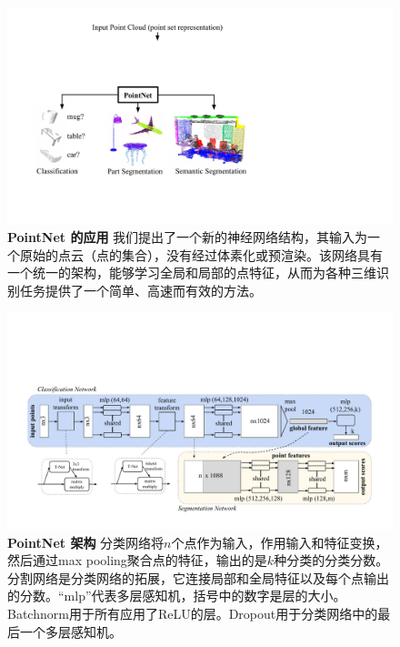 \begin{figure}
    \centering
    \includegraphics[width=\linewidth]{fig/teaser.pdf}
    \caption{\textbf{PointNet 的应用} 
    我们提出了一个新的神经网络结构，其输入为一个原始的点云（点的集合），没有经过体素化或预渲染。该网络具有一个统一的架构，能够学习全局和局部的点特征，从而为各种三维识别任务提供了一个简单、高速而有效的方法。 
    }
    \label{fig:teaser}
\end{figure}


\begin{figure}[th!]
    \centering
    \includegraphics[width=0.9\linewidth]{fig/pointnet_fixed.pdf}
    \caption{\textbf{PointNet 架构}      分类网络将$n$个点作为输入，作用输入和特征变换，然后通过max pooling聚合点的特征，输出的是$k$种分类的分类分数。分割网络是分类网络的拓展，它连接局部和全局特征以及每个点输出的分数。``mlp''代表多层感知机，括号中的数字是层的大小。Batchnorm用于所有应用了ReLU的层。Dropout用于分类网络中的最后一个多层感知机。}
    \label{fig:pointnet_arch}
\end{figure}